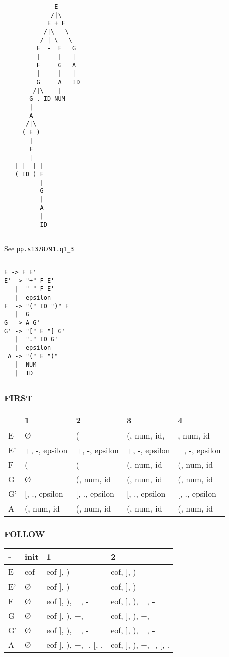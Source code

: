 \begin{verbatim}
              E
             /|\
            E + F
           /|\   \
          / | \   \
         E  -  F   G
         |     |   |
         F     G   A
         |     |   |
         G     A   ID
        /|\    |
       G . ID NUM
       |
       A
      /|\
     ( E )
       |
       F
   ____|___
   | |  | |
   ( ID ) F
          |
          G
          |
          A
          |
          ID
\end{verbatim}

\subsection{}
See \texttt{pp.s1378791.q1\_3}

\subsection{}
\begin{verbatim}
E -> F E'
E' -> "+" F E'
   |  "-" F E'
   |  epsilon
F  -> "(" ID ")" F
   |  G
G  -> A G'
G' -> "[" E "] G'
   |  "." ID G'
   |  epsilon
 A -> "(" E ")"
   |  NUM
   |  ID
\end{verbatim}

\subsection{}
\subsubsection{FIRST}
\begin{tabular}{lllll}
& 1 & 2 & 3 & 4 \\
\hline
E & Ø & ( &  (, num, id, &  , num, id \\
E'& +, -, epsilon & +, -, epsilon & +, -, epsilon & +, -, epsilon \\
F & ( & ( &  (, num, id &  (, num, id \\
G & Ø &  (, num, id &  (, num, id &  (, num, id \\
G'& [, ., epsilon & [, ., epsilon & [, ., epsilon & [, ., epsilon \\
A &  (, num, id &  (, num, id &  (, num, id &  (, num, id \\
\end{tabular}

\subsubsection{FOLLOW}
\begin{tabular}{llll}
- & init & 1 & 2 \\
\hline
E &  eof & eof ], ) & eof, ], ) \\
E'&  Ø & eof ], ) & eof, ], ) \\
F &  Ø & eof ], ), +, - &  eof, ], ), +, - \\
G &  Ø & eof ], ), +, - &  eof, ], ), +, - \\
G'&  Ø & eof ], ), +, - &  eof, ], ), +, - \\
A &  Ø & eof ], ), +, -, [, .  &  eof, ], ), +, -, [, . \\
\end{tabular}

